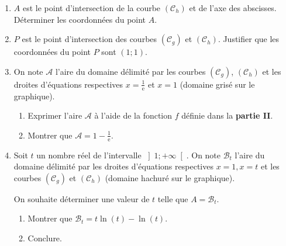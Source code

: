 \begin{center}
\end{center}
\begin{enumerate}
     \item
     $A$ est le point d'intersection de la courbe $\left(\mathscr C_{h}\right)$ et de l'axe des abscisses. Déterminer les coordonnées du point $A$.
     \item
     $P$ est le point d'intersection des courbes $\left(\mathscr C_{g}\right)$ et $\left(\mathscr C_{h}\right)$. Justifier que les coordonnées du point $P$ sont $\left(1 ; 1\right)$.
     \item
     On note $\mathscr A$ l'aire du domaine délimité par les courbes $\left(\mathscr C_{g}\right)$, $\left(\mathscr C_{h}\right)$ et les droites d'équations respectives $x=\frac{1}{\text{e}}$ et $x=1$ (domaine grisé sur le graphique).
     \begin{enumerate}
          \item
          Exprimer l'aire $\mathscr A$ à l'aide de la fonction $f$ définie dans la \textbf{partie II}.
          \item
          Montrer que $\mathscr A=1-\frac{1}{\text{e}}$.
     \end{enumerate}
     \item
     Soit $t$ un nombre réel de l'intervalle $\left]1; +\infty \right[$. On note $\mathscr B_{t}$ l'aire du domaine délimité par les droites d'équations respectives $x=1, x=t$ et les courbes $\left(\mathscr C_{g}\right)$ et $\left(\mathscr C_{h}\right)$ (domaine hachuré sur le graphique).
     \par
     On souhaite déterminer une valeur de $t$ telle que $A=\mathscr B_{t}$.
     \begin{enumerate}[label=\alph*.]
          \item
          Montrer que $\mathscr B_{t}=t \ln \left(t\right)-\ln \left(t\right)$.
          \item
          Conclure.
     \end{enumerate}
\end{enumerate}
